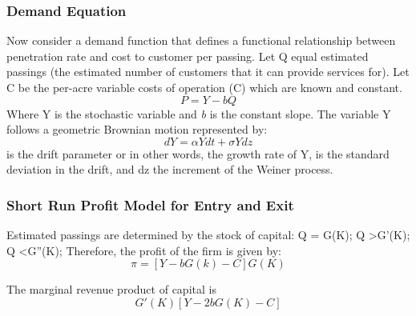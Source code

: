 \documentclass[a4paper,oneside]{article}
\begin{document}
\subsubsection{Demand Equation}
\:\:\:\:\:\:Now consider a demand function that defines a functional relationship between penetration rate and cost to customer per passing.
Let Q equal estimated passings (the estimated number of customers that it can provide services for).
Let C be the per-acre variable costs of operation (C) which are known and constant.
\begin{equation}
	P = Y - bQ
\end{equation}
	Where Y is the stochastic variable and \emph{b} is the constant slope. The variable Y follows a geometric Brownian motion represented by:
\begin{equation}
	dY = \alpha Y dt + \sigma Y dz
\end{equation}
	\textalpha\:\: is the drift parameter or in other words, the growth rate of Y, \textsigma \:\: is the standard deviation in the drift, and dz the increment of the Weiner process.

\subsubsection{Short Run Profit Model for Entry and Exit}
\:\:\:\:\:\:	Estimated passings are determined by the stock of capital:
	Q = G(K); \:\:\:\:\:\: Q \textgreater G'(K); \:\:\:\:\:\: Q \textless G''(K);
	Therefore, the profit of the firm is given by:
\begin{equation}
	\pi = [Y - bG(k)-C]G(K)
\end{equation}

The marginal revenue product of capital is \begin{equation}G'(K)[Y-2bG(K)-C]\end{equation}
\end{document}
